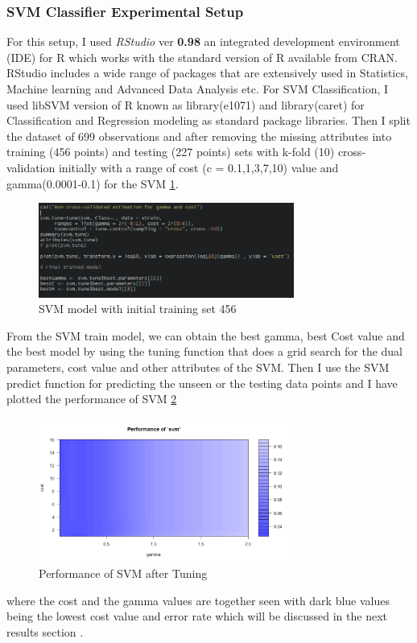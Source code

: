 \documentclass[conference]{IEEEtran}
\begin{document}
\subsubsection{SVM Classifier Experimental Setup}
For this setup, I used \textit{RStudio} ver \textbf{0.98} an integrated development environment (IDE) for R which works with the standard version of R available from CRAN. RStudio includes a wide range of packages that are extensively used in Statistics, Machine learning and Advanced Data Analysis etc. For SVM Classification, I used libSVM version of R known as library(e1071) and library(caret) for Classification and Regression modeling as standard package libraries. Then I split the dataset of 699 observations and after removing the missing attributes into training (456 points) and testing (227 points) sets with k-fold (10) cross-validation initially with a range of cost (c = 0.1,1,3,7,10) value and gamma(0.0001-0.1) for the SVM \ref{fig:svm_train}.

\begin{figure}[h]
\centering
\includegraphics[width=3.3in]{figs/svm_train.png}
\caption{SVM model with initial training set 456}
\label{fig:svm_train} 
\end{figure}

From the SVM \cite{kernme}train model, we can obtain the best gamma, best Cost value and the best model by using the tuning function that does a grid search for the dual parameters, cost value and other attributes of the SVM. Then I use the SVM predict function for predicting the unseen or the testing data points and I have plotted the performance of SVM \ref{fig:perf95_svm} 

\begin{figure}[htb!]
\centering
\includegraphics[width=3.25in]{figs/Perf95.png}
\caption{Performance of SVM after Tuning}
\label{fig:perf95_svm} 
\end{figure}
where the cost and the gamma values are together seen with dark blue values being the lowest cost value and error rate which will be discussed in the next results section .
\end{document}
